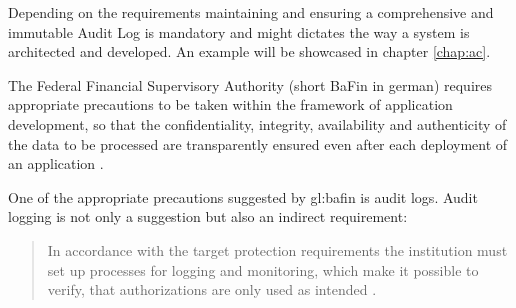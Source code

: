 Depending on the requirements maintaining and ensuring a comprehensive and immutable Audit Log is mandatory and might dictates the way a system is architected and developed. An example will be showcased in chapter \ref{chap:ac}.

The Federal Financial Supervisory Authority (short BaFin in german) requires appropriate precautions to be taken within the framework of application development, so that the confidentiality, integrity, availability and authenticity of the data to be processed are transparently ensured even after each deployment of an application \citep{BaFinZAIT}. 



One of the appropriate precautions suggested by \gls{gl:bafin} is audit logs. Audit logging is not only a suggestion but also an indirect requirement:

\begin{quote}
In accordance with the target protection requirements the institution must set up processes for logging and monitoring, which make it possible to verify, that authorizations are only used as intended \citep{BaFinZAIT}.
\end{quote}


